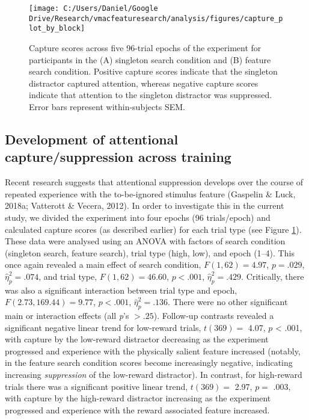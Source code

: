 \documentclass[jou, a4paper, noextraspace,floatsintext]{apa6}
\theoremstyle{definition}
\theoremstyle{definition}
\theoremstyle{definition}
\theoremstyle{remark}
\begin{document}
\begin{figure}

{\centering \texttt{[image: C:/Users/Daniel/Google Drive/Research/vmacfeaturesearch/analysis/figures/capture\_plot\_by\_block]} 

}

\caption{Capture scores across five 96-trial epochs of the
experiment for participants in the (A) singleton search condition and
(B) feature search condition. Positive capture scores indicate that the
singleton distractor captured attention, whereas negative capture scores
indicate that attention to the singleton distractor was suppressed.
Error bars represent within-subjects SEM.}\label{fig:blockPlot}
\end{figure}

\subsection{Development of attentional capture/suppression across
training}\label{development-of-attentional-capturesuppression-across-training}

Recent research suggests that attentional suppression develops over the
course of repeated experience with the to-be-ignored stimulus feature
(Gaspelin \& Luck, 2018a; Vatterott \& Vecera, 2012). In order to
investigate this in the current study, we divided the experiment into
four epochs (96 trials/epoch) and calculated capture scores (as
described earlier) for each trial type (see Figure \ref{fig:blockPlot}).
These data were analysed using an ANOVA with factors of search condition
(singleton search, feature search), trial type (high, low), and epoch
(1--4). This once again revealed a main effect of search condition,
\(F(1, 62) = 4.97\), \(p = .029\), \(\hat{\eta}^2_p = .074\), and trial
type, \(F(1, 62) = 46.60\), \(p < .001\), \(\hat{\eta}^2_p = .429\).
Critically, there was also a significant interaction between trial type
and epoch, \(F(2.73, 169.44) = 9.77\), \(p < .001\),
\(\hat{\eta}^2_p = .136\). There were no other significant main or
interaction effects (all \emph{p}'s \(>.25\)). Follow-up contrasts
revealed a significant negative linear trend for low-reward trials,
\(t(369)=\) 4.07, \(p\) \textless{} .001, with capture by the low-reward
distractor decreasing as the experiment progressed and experience with
the physically salient feature increased (notably, in the feature search
condition scores become increasingly negative, indicating increasing
\emph{suppression} of the low-reward distractor). In contrast, for
high-reward trials there was a significant positive linear trend,
\(t(369)=\) 2.97, \(p=\) .003, with capture by the high-reward
distractor increasing as the experiment progressed and experience with
the reward associated feature increased.
\end{document}
